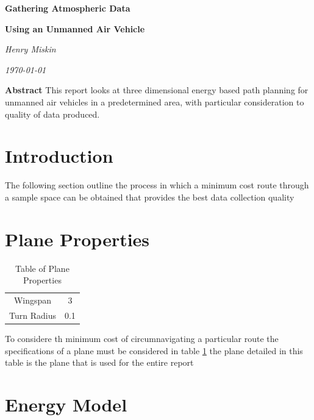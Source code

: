 \documentclass[a4paper,12pt,twoside]{article}
\begin{document}
\onehalfspacing

\begin{titlepage}
\clearpage
\vspace*{\fill}
\begin{center}
\begin{minipage}{.6\textwidth}
\centerline{\textbf{\huge Gathering Atmospheric Data}}
\centerline{\textbf{\large Using an Unmanned Air Vehicle}}
\centerline{\textit{Henry Miskin}}
\centerline{\textit{\today}}
\end{minipage}
\end{center}
\vspace{5cm}
\center
\textbf{Abstract}
\center
This report looks at three dimensional energy based path planning for unmanned air vehicles in a predetermined area, with particular consideration to quality of data produced.
\vfill

\clearpage
\end{titlepage}
\tableofcontents
\clearpage

\section{Introduction}
\label{sec:introduction}

The following section outline the process in which a minimum cost route through a sample space can be obtained that provides the best data collection quality

\section{Plane Properties}
\label{sec:plane_properties}

\begin{table}[width=\textwidth]
\centering
    \begin{tabular}{cc}
    Wingspan	& 3	\\
Turn Radius	& 0.1	\\

    \end{tabular}
\caption{Table of Plane Properties}
\label{tbl:table_of_plane_properties}
\end{table}

To considere th minimum cost of circumnavigating a particular route the specifications of a plane must be considered in table \ref{tbl:table_of_plane_properties} the plane detailed in this table is the plane that is used for the entire report

\section{Energy Model}
\label{sec:energy_model}
\end{document}
